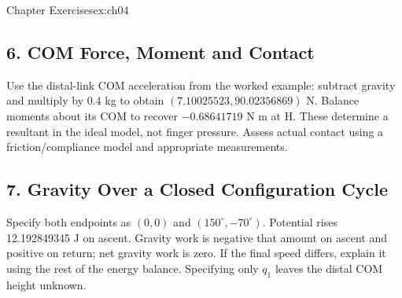 \begin{exercises}{Chapter Exercises}{ex:ch04}
\subsection*{6. COM Force, Moment and Contact}
Use the distal-link COM acceleration from the worked example: subtract gravity and multiply by 0.4 kg to obtain \((7.10025523,90.02356869)\) N. Balance moments about its COM to recover \(-0.68641719\) N m at H. These determine a resultant in the ideal model, not finger pressure. Assess actual contact using a friction/compliance model and appropriate measurements.

\subsection*{7. Gravity Over a Closed Configuration Cycle}
Specify both endpoints as \((0,0)\) and \((150^\circ,-70^\circ)\). Potential rises 12.192849345 J on ascent. Gravity work is negative that amount on ascent and positive on return; net gravity work is zero. If the final speed differs, explain it using the rest of the energy balance. Specifying only \(q_1\) leaves the distal COM height unknown.
\end{exercises}

\flushbottom{}
